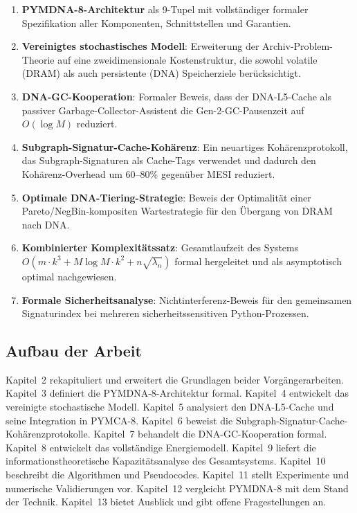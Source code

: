 ﻿\documentclass[a4paper,12pt]{article}
\theoremstyle{definition}
\begin{document}
\begin{enumerate}[noitemsep]
  \item \textbf{PYMDNA-8-Architektur} als 9-Tupel mit vollständiger formaler
    Spezifikation aller Komponenten, Schnittstellen und Garantien.
  \item \textbf{Vereinigtes stochastisches Modell}: Erweiterung der Archiv-Problem-Theorie
    auf eine zweidimensionale Kostenstruktur, die sowohl volatile (DRAM) als
    auch persistente (DNA) Speicherziele berücksichtigt.
  \item \textbf{DNA-GC-Kooperation}: Formaler Beweis, dass der DNA-L5-Cache
    als passiver Garbage-Collector-Assistent die Gen-2-GC-Pausenzeit auf
    $O(\log M)$ reduziert.
  \item \textbf{Subgraph-Signatur-Cache-Kohärenz}: Ein neuartiges Kohärenz\-protokoll,
    das Subgraph-Signaturen als Cache-Tags verwendet und dadurch den
    Kohärenz-Overhead um 60--80\% gegenüber MESI reduziert.
  \item \textbf{Optimale DNA-Tiering-Strategie}: Beweis der Optimalität
    einer Pareto/NegBin-kompositen Wartestrategie für den Übergang von
    DRAM nach DNA.
  \item \textbf{Kombinierter Komplexitätssatz}: Gesamtlaufzeit des Systems
    $O(m \cdot k^3 + M \log M \cdot k^2 + n \sqrt{\lambda_n})$ formal
    hergeleitet und als asymptotisch optimal nachgewiesen.
  \item \textbf{Formale Sicherheitsanalyse}: Nichtinterferenz-Beweis für
    den gemeinsamen Signaturindex bei mehreren sicherheitssensitiven
    Python-Prozessen.
\end{enumerate}

\subsection{Aufbau der Arbeit}

Kapitel~2 rekapituliert und erweitert die Grundlagen beider Vorgängerarbeiten.
Kapitel~3 definiert die PYMDNA-8-Architektur formal.
Kapitel~4 entwickelt das vereinigte stochastische Modell.
Kapitel~5 analysiert den DNA-L5-Cache und seine Integration in PYMCA-8.
Kapitel~6 beweist die Subgraph-Signatur-Cache-Kohärenzprotokolle.
Kapitel~7 behandelt die DNA-GC-Kooperation formal.
Kapitel~8 entwickelt das vollständige Energiemodell.
Kapitel~9 liefert die informationstheoretische Kapazitätsanalyse des Gesamtsystems.
Kapitel~10 beschreibt die Algorithmen und Pseudocodes.
Kapitel~11 stellt Experimente und numerische Validierungen vor.
Kapitel~12 vergleicht PYMDNA-8 mit dem Stand der Technik.
Kapitel~13 bietet Ausblick und gibt offene Fragestellungen an.
\end{document}
